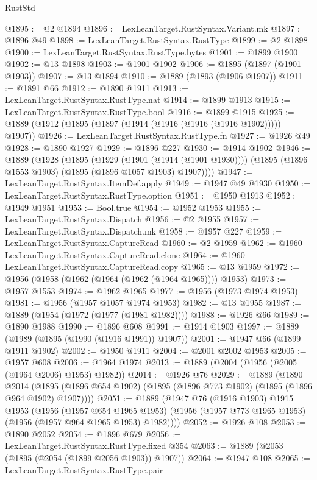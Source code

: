 \begin{lexlean}{RustStd}
\begin{coremodule}
@1895 := @2 @1894
@1896 := LexLeanTarget.RustSyntax.Variant.mk
@1897 := @1896 @49
@1898 := LexLeanTarget.RustSyntax.RustType
@1899 := @2 @1898
@1900 := LexLeanTarget.RustSyntax.RustType.bytes
@1901 := @1899 @1900
@1902 := @13 @1898
@1903 := @1901 @1902
@1906 := @1895 (@1897 (@1901 @1903))
@1907 := @13 @1894
@1910 := @1889 (@1893 (@1906 @1907))
@1911 := @1891 @66
@1912 := @1890 @1911
@1913 := LexLeanTarget.RustSyntax.RustType.nat
@1914 := @1899 @1913
@1915 := LexLeanTarget.RustSyntax.RustType.bool
@1916 := @1899 @1915
@1925 := @1889 (@1912 (@1895 (@1897 (@1914 (@1916 (@1916 (@1916 @1902))))) @1907))
@1926 := LexLeanTarget.RustSyntax.RustType.fn
@1927 := @1926 @49
@1928 := @1890 @1927
@1929 := @1896 @227
@1930 := @1914 @1902
@1946 := @1889
    (@1928
      (@1895
        (@1929 (@1901 (@1914 (@1901 @1930))))
        (@1895 (@1896 @1553 @1903) (@1895 (@1896 @1057 @1903) @1907))))
@1947 := LexLeanTarget.RustSyntax.ItemDef.apply
@1949 := @1947 @49 @1930
@1950 := LexLeanTarget.RustSyntax.RustType.option
@1951 := @1950 @1913
@1952 := @1949 @1951
@1953 := Bool.true
@1954 := @1952 @1953
@1955 := LexLeanTarget.RustSyntax.Dispatch
@1956 := @2 @1955
@1957 := LexLeanTarget.RustSyntax.Dispatch.mk
@1958 := @1957 @227
@1959 := LexLeanTarget.RustSyntax.CaptureRead
@1960 := @2 @1959
@1962 := @1960 LexLeanTarget.RustSyntax.CaptureRead.clone
@1964 := @1960 LexLeanTarget.RustSyntax.CaptureRead.copy
@1965 := @13 @1959
@1972 := @1956 (@1958 (@1962 (@1964 (@1962 (@1964 @1965)))) @1953)
@1973 := @1957 @1553
@1974 := @1962 @1965
@1977 := @1956 (@1973 @1974 @1953)
@1981 := @1956 (@1957 @1057 @1974 @1953)
@1982 := @13 @1955
@1987 := @1889 (@1954 (@1972 (@1977 (@1981 @1982))))
@1988 := @1926 @66
@1989 := @1890 @1988
@1990 := @1896 @608
@1991 := @1914 @1903
@1997 := @1889 (@1989 (@1895 (@1990 (@1916 @1991)) @1907))
@2001 := @1947 @66 (@1899 @1911 @1902)
@2002 := @1950 @1911
@2004 := @2001 @2002 @1953
@2005 := @1957 @608
@2006 := @1964 @1974
@2013 := @1889 (@2004 (@1956 (@2005 (@1964 @2006) @1953) @1982))
@2014 := @1926 @76
@2029 := @1889
    (@1890
      @2014
      (@1895 (@1896 @654 @1902) (@1895 (@1896 @773 @1902) (@1895 (@1896 @964 @1902) @1907))))
@2051 := @1889
    (@1947
      @76
      (@1916 @1903)
      @1915
      @1953
      (@1956
        (@1957 @654 @1965 @1953)
        (@1956 (@1957 @773 @1965 @1953) (@1956 (@1957 @964 @1965 @1953) @1982))))
@2052 := @1926 @108
@2053 := @1890 @2052
@2054 := @1896 @679
@2056 := LexLeanTarget.RustSyntax.RustType.fixed @354
@2063 := @1889 (@2053 (@1895 (@2054 (@1899 @2056 @1903)) @1907))
@2064 := @1947 @108
@2065 := LexLeanTarget.RustSyntax.RustType.pair

\end{coremodule}
\end{lexlean}
